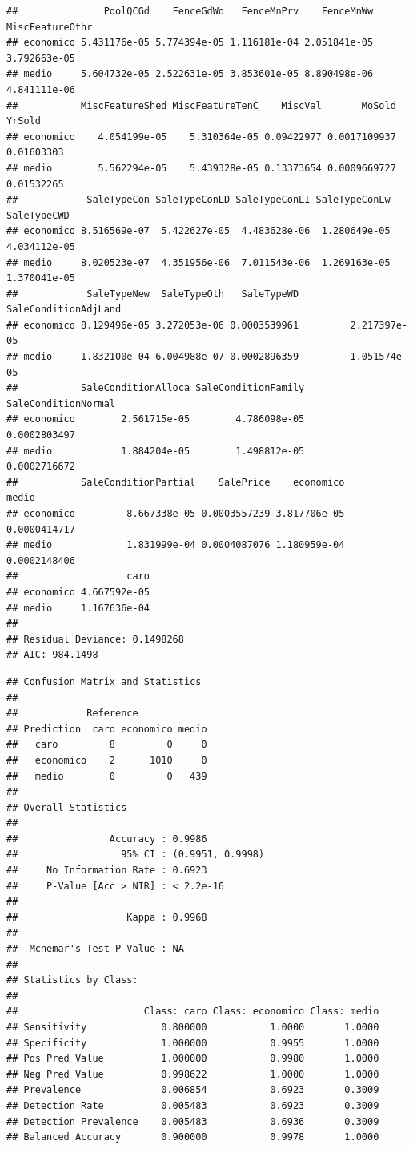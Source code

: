 \documentclass[
]{article}
\begin{document}
\begin{verbatim}
##               PoolQCGd    FenceGdWo   FenceMnPrv    FenceMnWw MiscFeatureOthr
## economico 5.431176e-05 5.774394e-05 1.116181e-04 2.051841e-05    3.792663e-05
## medio     5.604732e-05 2.522631e-05 3.853601e-05 8.890498e-06    4.841111e-06
##           MiscFeatureShed MiscFeatureTenC    MiscVal       MoSold     YrSold
## economico    4.054199e-05    5.310364e-05 0.09422977 0.0017109937 0.01603303
## medio        5.562294e-05    5.439328e-05 0.13373654 0.0009669727 0.01532265
##            SaleTypeCon SaleTypeConLD SaleTypeConLI SaleTypeConLw  SaleTypeCWD
## economico 8.516569e-07  5.422627e-05  4.483628e-06  1.280649e-05 4.034112e-05
## medio     8.020523e-07  4.351956e-06  7.011543e-06  1.269163e-05 1.370041e-05
##            SaleTypeNew  SaleTypeOth   SaleTypeWD SaleConditionAdjLand
## economico 8.129496e-05 3.272053e-06 0.0003539961         2.217397e-05
## medio     1.832100e-04 6.004988e-07 0.0002896359         1.051574e-05
##           SaleConditionAlloca SaleConditionFamily SaleConditionNormal
## economico        2.561715e-05        4.786098e-05        0.0002803497
## medio            1.884204e-05        1.498812e-05        0.0002716672
##           SaleConditionPartial    SalePrice    economico        medio
## economico         8.667338e-05 0.0003557239 3.817706e-05 0.0000414717
## medio             1.831999e-04 0.0004087076 1.180959e-04 0.0002148406
##                   caro
## economico 4.667592e-05
## medio     1.167636e-04
## 
## Residual Deviance: 0.1498268 
## AIC: 984.1498
\end{verbatim}

\begin{verbatim}
## Confusion Matrix and Statistics
## 
##            Reference
## Prediction  caro economico medio
##   caro         8         0     0
##   economico    2      1010     0
##   medio        0         0   439
## 
## Overall Statistics
##                                           
##                Accuracy : 0.9986          
##                  95% CI : (0.9951, 0.9998)
##     No Information Rate : 0.6923          
##     P-Value [Acc > NIR] : < 2.2e-16       
##                                           
##                   Kappa : 0.9968          
##                                           
##  Mcnemar's Test P-Value : NA              
## 
## Statistics by Class:
## 
##                      Class: caro Class: economico Class: medio
## Sensitivity             0.800000           1.0000       1.0000
## Specificity             1.000000           0.9955       1.0000
## Pos Pred Value          1.000000           0.9980       1.0000
## Neg Pred Value          0.998622           1.0000       1.0000
## Prevalence              0.006854           0.6923       0.3009
## Detection Rate          0.005483           0.6923       0.3009
## Detection Prevalence    0.005483           0.6936       0.3009
## Balanced Accuracy       0.900000           0.9978       1.0000
\end{verbatim}
\end{document}

